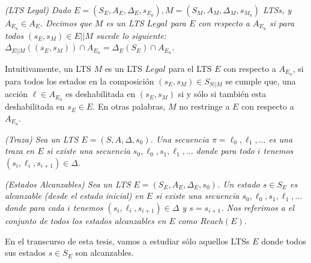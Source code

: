 \begin{nahaDef}
    \emph{(LTS Legal) Dado $E = (S_E, A_E, \Delta_E, s_{E_0}), M = (S_M, A_M, \Delta_M, s_{M_0})$ LTSs, y $A_{E_u} \in
    A_E$. Decimos que $M$ es un LTS $Legal$ para $E$ con respecto a $A_{E_u}$ si para todos $(s_E,s_M) \in E||M$ sucede
    lo siguiente: $\Delta_{E||M}((s_E,s_M)) \cap A_{E_u} = \Delta_E(S_E) \cap A_{E_u}$.}
\end{nahaDef} 

Intuitivamente, un LTS $M$ es un LTS $Legal$ para el LTS $E$ con respecto a $A_{E_u}$, si para todos los estados en la
composición $(s_E,s_M) \in S_{S||M}$ se cumple que, una acción $\ell \in A_{E_u}$ es deshabilitada en $(s_E,s_M)$ si y sólo
si también esta deshabilitada en $s_E \in E$. En otras palabras, $M$ no restringe a $E$ con respecto a $A_{E_u}$.


\begin{nahaDef}
    \emph{(Traza) Sea un LTS $E = (S,A,\Delta,s_0)$. Una secuencia $\pi = \ell_0,\ell_1,...$ es una traza en $E$ si existe una
    secuencia $s_0,\ell_0,s_1,\ell_1,...$ donde para todo $i$ tenemos $(s_i,\ell_i,s_{i+1}) \in \Delta$.}
\end{nahaDef} 


\begin{nahaDef}
    \emph{(Estados Alcanzables) Sea un LTS $E = (S_E, A_E, \Delta_E, s_0)$. Un estado $s \in S_E$ es alcanzable (desde
    el estado inicial) en $E$ si existe una secuencia $s_0,\ell_0,s_1,\ell_1,...$ donde para cada $i$ tenemos
    $(s_i,\ell_i,s_{i+1}) \in \Delta$ y $s = s_{i+1}$. Nos referimos a el conjunto de todos los estados alcanzables en $E$
    como $Reach(E)$.}
\end{nahaDef} 

En el transcurso de esta tesis, vamos a estudiar sólo aquellos LTSs $E$ donde todos sus estados $s \in S_E$ son
alcanzables.
